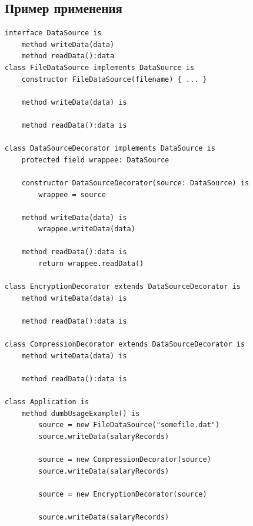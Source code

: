 \subsection{Пример применения}
\begin{lstlisting}
interface DataSource is
    method writeData(data)
    method readData():data
class FileDataSource implements DataSource is
    constructor FileDataSource(filename) { ... }

    method writeData(data) is

    method readData():data is

class DataSourceDecorator implements DataSource is
    protected field wrappee: DataSource

    constructor DataSourceDecorator(source: DataSource) is
        wrappee = source

    method writeData(data) is
        wrappee.writeData(data)

    method readData():data is
        return wrappee.readData()

class EncryptionDecorator extends DataSourceDecorator is
    method writeData(data) is

    method readData():data is

class CompressionDecorator extends DataSourceDecorator is
    method writeData(data) is

    method readData():data is

class Application is
    method dumbUsageExample() is
        source = new FileDataSource("somefile.dat")
        source.writeData(salaryRecords)

        source = new CompressionDecorator(source)
        source.writeData(salaryRecords)

        source = new EncryptionDecorator(source)

        source.writeData(salaryRecords)
\end{lstlisting}

